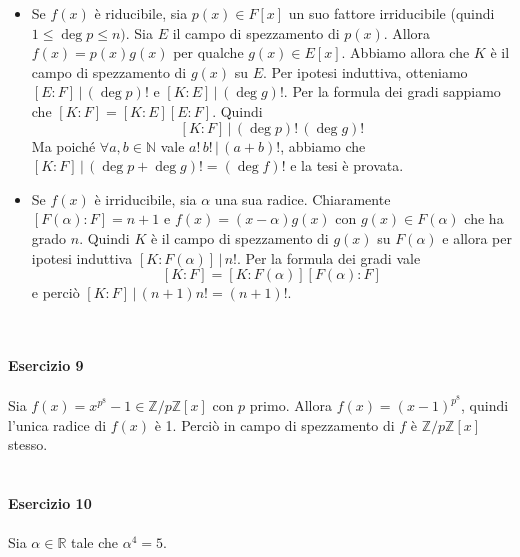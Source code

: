 \documentclass[12pt,a4paper]{report}
\theoremstyle{definition}
\begin{document}
\begin{itemize}
\item Se $f(x)$ è riducibile, sia $p(x) \in F[x]$ un suo fattore irriducibile (quindi $1 \leq \deg p \leq n)$. Sia $E$ il campo di spezzamento di $p(x)$. Allora $f(x)=p(x)g(x)$ per qualche $g(x) \in E[x]$. Abbiamo allora che $K$ è il campo di spezzamento di $g(x)$ su $E$. Per ipotesi induttiva, otteniamo  $[E:F] \, | \, (\deg p)!$ e $[K:E] \, | \, (\deg g)!$. Per la formula dei gradi sappiamo che $[K:F]=[K:E][E:F]$. Quindi
$$[K:F] \, | \, (\deg p)! \, (\deg g)!$$
Ma poiché $\forall a,b \in \mathbb{N}$ vale $a! \, b! \, | \, (a+b)!$, abbiamo che $[K:F] \, | \, (\deg p + \deg g)!=(\deg f)!$ e la tesi è provata.
\item Se $f(x)$ è irriducibile, sia $\alpha$ una sua radice. Chiaramente $[F(\alpha):F]=n+1$ e $f(x)=(x-\alpha)g(x)$ con $g(x) \in F(\alpha)$ che ha grado $n$. Quindi $K$ è il campo di spezzamento di $g(x)$ su $F(\alpha)$ e allora per ipotesi induttiva $[K:F(\alpha)] \, | \, n!$. Per la formula dei gradi vale
$$[K:F]=[K:F(\alpha)][F(\alpha):F]$$
e perciò $[K:F] \, | \, (n+1)n!=(n+1)!$.
\end{itemize}
\ 
\\
\\
\noindent\textbf{Esercizio 9}\\
\\
Sia $f(x)=x^{p^8}-1 \in \mathbb{Z}/p\mathbb{Z}[x]$ con $p$ primo. Allora $f(x)=(x-1)^{p^8}$, quindi l'unica radice di $f(x)$ è 1. Perciò in campo di spezzamento di $f$ è $\mathbb{Z}/p\mathbb{Z}[x]$ stesso.
\\
\\
\\
\noindent\textbf{Esercizio 10}\\
\\
Sia $\alpha \in \mathbb{R}$ tale che $\alpha^4=5$.
\end{document}
